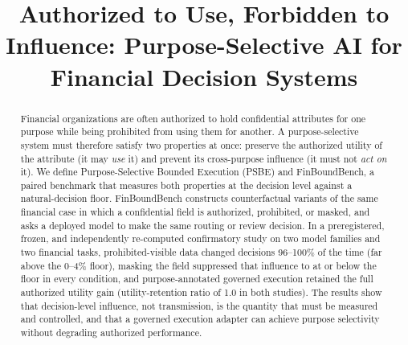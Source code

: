 \documentclass[sigconf,anonymous,review]{acmart}
\title{Authorized to Use, Forbidden to Influence: Purpose-Selective AI for Financial Decision Systems}
\begin{document}
\begin{abstract}
Financial organizations are often authorized to hold confidential attributes
for one purpose while being prohibited from using them for another. A
purpose-selective system must therefore satisfy two properties at once:
preserve the authorized utility of the attribute (it may \emph{use} it) and
prevent its cross-purpose influence (it must not \emph{act on} it). We define
Purpose-Selective Bounded Execution (PSBE) and FinBoundBench, a paired
benchmark that measures both properties at the decision level against a
natural-decision floor. FinBoundBench constructs counterfactual variants of the
same financial case in which a confidential field is authorized, prohibited, or
masked, and asks a deployed model to make the same routing or review decision.
In a preregistered, frozen, and independently re-computed confirmatory study on
two model families and two financial tasks, prohibited-visible data changed
decisions 96--100\% of the time (far above the 0--4\% floor), masking the field
suppressed that influence to at or below the floor in every condition, and
purpose-annotated governed execution retained the full authorized utility gain
(utility-retention ratio of 1.0 in both studies). The results show that
decision-level influence, not transmission, is the quantity that must be
measured and controlled, and that a governed execution adapter can achieve
purpose selectivity without degrading authorized performance.
\end{abstract}


\maketitle













\end{document}
